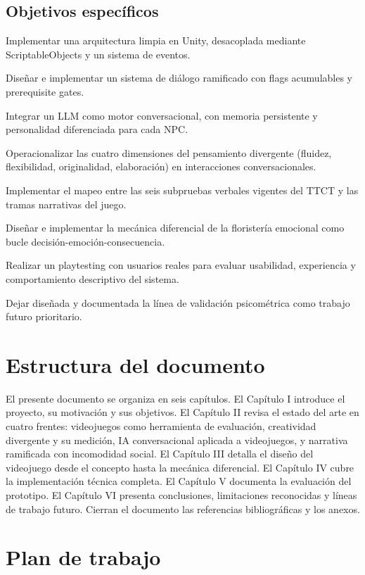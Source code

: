 \documentclass[12pt,twoside,titlepage]{report}
\begin{document}
\subsection{Objetivos específicos}

Implementar una arquitectura limpia en Unity, desacoplada mediante ScriptableObjects y un sistema de eventos.

Diseñar e implementar un sistema de diálogo ramificado con flags acumulables y prerequisite gates.

Integrar un LLM como motor conversacional, con memoria persistente y personalidad diferenciada para cada NPC.

Operacionalizar las cuatro dimensiones del pensamiento divergente (fluidez, flexibilidad, originalidad, elaboración) en interacciones conversacionales.

Implementar el mapeo entre las seis subpruebas verbales vigentes del TTCT y las tramas narrativas del juego.

Diseñar e implementar la mecánica diferencial de la floristería emocional como bucle decisión-emoción-consecuencia.

Realizar un playtesting con usuarios reales para evaluar usabilidad, experiencia y comportamiento descriptivo del sistema.

Dejar diseñada y documentada la línea de validación psicométrica como trabajo futuro prioritario.

\section{Estructura del documento}

El presente documento se organiza en seis capítulos. El Capítulo I introduce el proyecto, su motivación y sus objetivos. El Capítulo II revisa el estado del arte en cuatro frentes: videojuegos como herramienta de evaluación, creatividad divergente y su medición, IA conversacional aplicada a videojuegos, y narrativa ramificada con incomodidad social. El Capítulo III detalla el diseño del videojuego desde el concepto hasta la mecánica diferencial. El Capítulo IV cubre la implementación técnica completa. El Capítulo V documenta la evaluación del prototipo. El Capítulo VI presenta conclusiones, limitaciones reconocidas y líneas de trabajo futuro. Cierran el documento las referencias bibliográficas y los anexos.

\section{Plan de trabajo}
\end{document}
